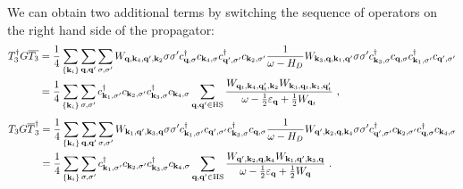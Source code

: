 \documentclass{revtex4-2}
\begin{document}
We can obtain two additional terms by switching the sequence of operators on the right hand side of the propagator:
\begin{equation}\begin{aligned}
	T_3^\dagger G \overline{T_3} &= \frac{1}{4}\sum_{\left\{ {\bf k}_i \right\} }\sum_{{\bf q},{\bf q}^\prime}\sum_{\sigma,\sigma^\prime} W_{{\bf q},{\bf k}_4, {\bf q}^\prime, {\bf k}_2} \sigma\sigma^\prime c^\dagger_{{\bf q},\sigma}c_{{\bf k}_4,\sigma}c^\dagger_{{\bf q}^\prime,\sigma^\prime}c_{{\bf k}_2,\sigma^\prime} \frac{1}{\omega - H_D} W_{{\bf k}_3, {\bf q}, {\bf k}_1,{\bf q}^\prime} \sigma\sigma^\prime c^\dagger_{{\bf k}_3,\sigma} c_{{\bf q},\sigma} c^\dagger_{{\bf k}_1,\sigma^\prime} c_{{\bf q}^\prime,\sigma^\prime}\\
			  &= \frac{1}{4}\sum_{\left\{ {\bf k}_i \right\}}\sum_{\sigma,\sigma^\prime} c^\dagger_{{\bf k}_1,\sigma^\prime} c_{{\bf k}_2,\sigma^\prime} c^\dagger_{{\bf k}_3,\sigma}c_{{\bf k}_4,\sigma}  \sum_{{\bf q}, {\bf q}^\prime \in \text{HS}}\frac{W_{{\bf q}_t,{\bf k}_4, {\bf q}_t^\prime, {\bf k}_2} W_{{\bf k}_3, {\bf q}_t, {\bf k}_1,{\bf q}_t^\prime}}{\omega - \frac{1}{2}\varepsilon_{{\bf q}} + \frac{1}{2}W_{{\bf q}_t}}~,
\end{aligned}\end{equation}
\begin{equation}\begin{aligned}
	T_3 G \overline T_3^\dagger &= \frac{1}{4}\sum_{\left\{ {\bf k}_i \right\} }\sum_{{\bf q},{\bf q}^\prime}\sum_{\sigma,\sigma^\prime} W_{{\bf k}_1,{\bf q}^\prime, {\bf k}_3, {\bf q}} \sigma\sigma^\prime c^\dagger_{{\bf k}_1,\sigma^\prime} c_{{\bf q}^\prime,\sigma^\prime} c^\dagger_{{\bf k}_3,\sigma} c_{{\bf q},\sigma} \frac{1}{\omega - H_D} W_{{\bf q}^\prime, {\bf k}_2, {\bf q},{\bf k}_4} \sigma\sigma^\prime c^\dagger_{{\bf q}^\prime,\sigma^\prime}c_{{\bf k}_2,\sigma^\prime} c^\dagger_{{\bf q},\sigma}c_{{\bf k}_4,\sigma}\\
			  &= \frac{1}{4}\sum_{\left\{ {\bf k}_i \right\}}\sum_{\sigma,\sigma^\prime} c^\dagger_{{\bf k}_1,\sigma^\prime} c_{{\bf k}_2,\sigma^\prime} c^\dagger_{{\bf k}_3,\sigma}c_{{\bf k}_4,\sigma}  \sum_{{\bf q}, {\bf q}^\prime \in \text{HS}}\frac{W_{{\bf q}^\prime, {\bf k}_2, {\bf q},{\bf k}_4} W_{{\bf k}_1,{\bf q}^\prime, {\bf k}_3, {\bf q}}}{\omega - \frac{1}{2}\varepsilon_{{\bf q}} + \frac{1}{2}W_{{\bf q}}}~.
\end{aligned}\end{equation}
\end{document}
